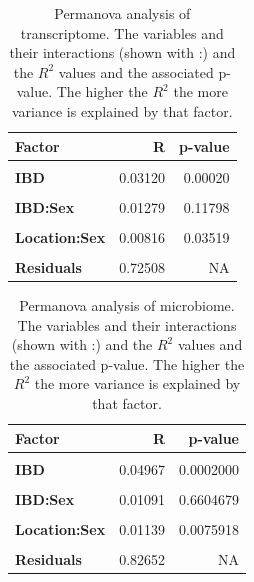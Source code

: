 \documentclass[
  a4paper,
]{book}
\begin{document}
\begin{table}[H]

\caption[Permanova analysis of transcriptome.]{\label{tab:hsct-permanova-rnaseq}Permanova analysis of transcriptome. The variables and their interactions (shown with :) and the $R^2$ values and the associated p-value. The higher the $R^2$ the more variance is explained by that factor.}
\centering
\begin{tabular}[t]{>{}l||r|r}
\hline
Factor & R & p-value\\
\hline
\textbf{\cellcolor{gray!6}{Location}} & \cellcolor{gray!6}{0.18057} & \cellcolor{gray!6}{0.00020}\\
\hline
\textbf{IBD} & 0.03120 & 0.00020\\
\hline
\textbf{\cellcolor{gray!6}{Sex}} & \cellcolor{gray!6}{0.01306} & \cellcolor{gray!6}{0.00120}\\
\hline
\textbf{IBD:Sex} & 0.01279 & 0.11798\\
\hline
\textbf{\cellcolor{gray!6}{Location:IBD}} & \cellcolor{gray!6}{0.02427} & \cellcolor{gray!6}{0.11458}\\
\hline
\textbf{Location:Sex} & 0.00816 & 0.03519\\
\hline
\textbf{\cellcolor{gray!6}{Location:IBD:Sex}} & \cellcolor{gray!6}{0.00486} & \cellcolor{gray!6}{0.52190}\\
\hline
\textbf{Residuals} & 0.72508 & NA\\
\hline
\end{tabular}
\end{table}

\begin{table}[H]

\caption[Permanova analysis of microbiome]{\label{tab:hsct-permanova-microbiome}Permanova analysis of microbiome. The variables and their interactions (shown with :) and the $R^2$ values and the associated p-value. The higher the $R^2$ the more variance is explained by that factor.}
\centering
\begin{tabular}[t]{>{}l||r|r}
\hline
Factor & R & p-value\\
\hline
\textbf{\cellcolor{gray!6}{Location}} & \cellcolor{gray!6}{0.06061} & \cellcolor{gray!6}{0.0002000}\\
\hline
\textbf{IBD} & 0.04967 & 0.0002000\\
\hline
\textbf{\cellcolor{gray!6}{Sex}} & \cellcolor{gray!6}{0.01712} & \cellcolor{gray!6}{0.0003999}\\
\hline
\textbf{IBD:Sex} & 0.01091 & 0.6604679\\
\hline
\textbf{\cellcolor{gray!6}{Location:IBD}} & \cellcolor{gray!6}{0.02089} & \cellcolor{gray!6}{0.8476305}\\
\hline
\textbf{Location:Sex} & 0.01139 & 0.0075918\\
\hline
\textbf{\cellcolor{gray!6}{Location:IBD:Sex}} & \cellcolor{gray!6}{0.00289} & \cellcolor{gray!6}{0.9994001}\\
\hline
\textbf{Residuals} & 0.82652 & NA\\
\hline
\end{tabular}
\end{table}
\end{document}
